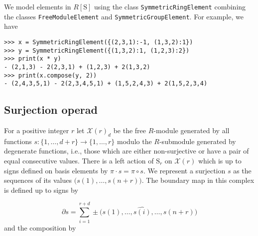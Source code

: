 \documentclass{amsart}
\renewcommand{\S}{\mathrm S}
\begin{document}
We model elements in $R[\S]$ using the class \texttt{SymmetricRingElement} combining the classes \texttt{FreeModuleElement} and \texttt{SymmetricGroupElement}. For example, we have
\begin{verbatim}
>>> x = SymmetricRingElement({(2,3,1):-1, (1,3,2):1})
>>> y = SymmetricRingElement({(1,3,2):1, (1,2,3):2})
>>> print(x * y)
- (2,1,3) - 2(2,3,1) + (1,2,3) + 2(1,3,2)
>>> print(x.compose(y, 2))
- (2,4,3,5,1) - 2(2,3,4,5,1) + (1,5,2,4,3) + 2(1,5,2,3,4)
\end{verbatim}

\subsection{Surjection operad}

For a positive integer $r$ let $\mathcal X(r)_d$ be the free $R$-module generated by all functions $s : \{1, \dots, d+r\} \to \{1, \dots, r\}$ modulo the $R$-submodule generated by degenerate functions, i.e., those which are either non-surjective or have a pair of equal consecutive values. There is a left action of $\mathrm S_r$ on $\mathcal X(r)$ which is up to signs defined on basis elements by $\pi \cdot s = \pi \circ s$.
We represent a surjection $s$ as the sequences of its values $\big( s(1), \dots, s(n+r) \big)$. The boundary map in this complex is defined up to signs by

\begin{equation*}
\partial s = \sum_{i = 1}^{r+d} \pm \big( s(1), \dots, \widehat{s(i)}, \dots, s(n+r) \big)
\end{equation*}
and the composition by





\end{document}
